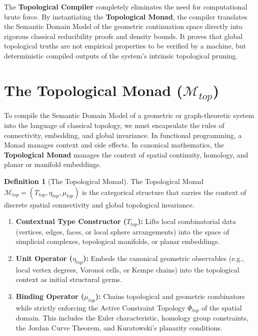 \documentclass[12pt,openany]{extbook}
\theoremstyle{plain}
\theoremstyle{definition}
\newtheorem{definition}{Definition}[chapter]
\begin{document}
The \textbf{Topological Compiler} completely eliminates the need for computational brute force. By instantiating the \textbf{Topological Monad}, the compiler translates the Semantic Domain Model of the geometric continuation space directly into rigorous classical reducibility proofs and density bounds. It proves that global topological truths are not empirical properties to be verified by a machine, but deterministic compiled outputs of the system's intrinsic topological pruning.

\section{The Topological Monad ($\mathcal{M}_{top}$)}

To compile the Semantic Domain Model of a geometric or graph-theoretic system into the language of classical topology, we must encapsulate the rules of connectivity, embedding, and global invariance. In functional programming, a Monad manages context and side effects. In canonical mathematics, the \textbf{Topological Monad} manages the context of spatial continuity, homology, and planar or manifold embeddings.

\begin{definition}[The Topological Monad]
The Topological Monad $\mathcal{M}_{top} = (T_{top}, \eta_{top}, \mu_{top})$ is the categorical structure that carries the context of discrete spatial connectivity and global topological invariance.
\begin{enumerate}
    \item \textbf{Contextual Type Constructor ($T_{top}$):} Lifts local combinatorial data (vertices, edges, faces, or local sphere arrangements) into the space of simplicial complexes, topological manifolds, or planar embeddings.
    \item \textbf{Unit Operator ($\eta_{top}$):} Embeds the canonical geometric observables (e.g., local vertex degrees, Voronoi cells, or Kempe chains) into the topological context as initial structural germs.
    \item \textbf{Binding Operator ($\mu_{top}$):} Chains topological and geometric combinators while strictly enforcing the Active Constraint Topology $\Phi_{top}$ of the spatial domain. This includes the Euler characteristic, homology group constraints, the Jordan Curve Theorem, and Kuratowski's planarity conditions.
\end{enumerate}
\end{definition}
\end{document}
